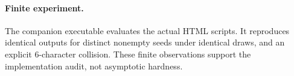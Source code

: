 \documentclass[11pt]{article}
\begin{document}
\paragraph{Finite experiment.} The companion executable evaluates the actual
HTML scripts. It reproduces identical outputs for distinct nonempty seeds
under identical draws, and an explicit 6-character collision. These finite
observations support the implementation audit, not asymptotic hardness.



\end{document}
